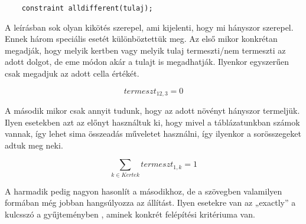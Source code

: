 \documentclass[12pt,a4paper,twoside, openright]{report}
\begin{document}
    \begin{lstlisting}
    constraint alldifferent(tulaj); \end{lstlisting}

    A leírásban sok olyan kikötés szerepel, ami kijelenti, hogy mi hányszor szerepel.
    Ennek három speciális esetét különböztettük meg.
    Az első mikor konkrétan megadják, hogy melyik kertben vagy melyik tulaj termeszti/nem termeszti az adott dolgot, de eme módon akár a tulajt is megadhatják.
    Ilyenkor egyszerűen csak megadjuk az adott cella értékét.

    \begin{equation}
    termeszt_{12,3}=0 
    \end{equation}

    A második mikor csak annyit tudunk, hogy az adott növényt hányszor termeljük.
    Ilyen esetekben azt az előnyt használtuk ki, hogy mivel a táblázatunkban számok vannak, így lehet sima összeadás műveletet használni, így ilyenkor a sorösszegeket adtuk meg neki.
    
	\begin{equation}
    \sum_{k\in Kertek} termeszt_{1,k} =1 
    \end{equation}

    A harmadik pedig nagyon hasonlít a másodikhoz, de a szövegben valamilyen formában még jobban hangsúlyozza az állítást.
    Ilyen esetekre van az „exactly” a kulcsszó a gyűjteményben , aminek konkrét felépítési kritériuma van.
\end{document}
